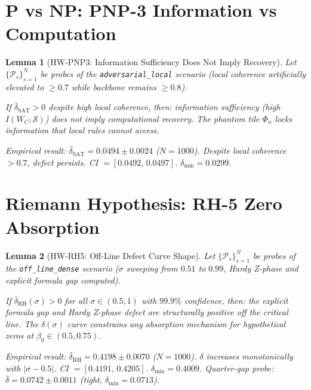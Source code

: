 \documentclass[11pt]{article}
\newtheorem{lemma}{Lemma}[section]
\begin{document}
\section{P vs NP: PNP-3 Information vs Computation}

\begin{lemma}[HW-PNP3: Information Sufficiency Does Not Imply Recovery]
\label{lem:hw-pnp3}
Let $\{\mathcal{P}_s\}_{s=1}^{N}$ be probes of the
\texttt{adversarial\_local} scenario (local coherence artificially
elevated to $\geq 0.7$ while backbone remains $\geq 0.8$).

If $\bar{\delta}_{\mathrm{SAT}} > 0$ despite high local coherence,
then: information sufficiency (high $I(W_C;\mathcal{S})$) does
\emph{not} imply computational recovery. The phantom tile
$\Phi_n$ locks information that local rules cannot access.

\emph{Empirical result}: $\bar{\delta}_{\mathrm{SAT}} = 0.0494 \pm 0.0024$
($N=1000$). Despite local coherence $> 0.7$, defect persists.
CI $=[0.0492,\,0.0497]$. $\delta_{\min} = 0.0299$.
\end{lemma}

\section{Riemann Hypothesis: RH-5 Zero Absorption}

\begin{lemma}[HW-RH5: Off-Line Defect Curve Shape]
\label{lem:hw-rh5}
Let $\{\mathcal{P}_s\}_{s=1}^{N}$ be probes of the
\texttt{off\_line\_dense} scenario ($\sigma$ sweeping from $0.51$
to $0.99$, Hardy Z-phase and explicit formula gap computed).

If $\bar{\delta}_{\mathrm{RH}}(\sigma) > 0$ for all
$\sigma \in (0.5,1)$ with $99.9\%$ confidence, then:
the explicit formula gap and Hardy Z-phase defect are structurally
positive off the critical line. The $\delta(\sigma)$ curve
constrains any absorption mechanism for hypothetical zeros
at $\beta_0 \in (0.5,0.75)$.

\emph{Empirical result}: $\bar{\delta}_{\mathrm{RH}} = 0.4198 \pm 0.0070$
($N=1000$). $\delta$ increases monotonically with $|\sigma-0.5|$.
CI $=[0.4191,\,0.4205]$. $\delta_{\min} = 0.4009$.
Quarter-gap probe: $\bar{\delta} = 0.0742 \pm 0.0011$ (tight, $\delta_{\min}=0.0713$).
\end{lemma}
\end{document}
